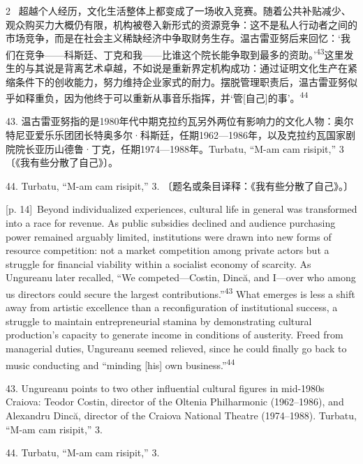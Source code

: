 \documentclass[10pt,a4paper]{article}
\begin{document}
\begin{paracol}{2}
\switchcolumn*
{\scriptsize\color{gray} [p. 14]}\ 超越个人经历，文化生活整体上都变成了一场收入竞赛。随着公共补贴减少、观众购买力大概仍有限，机构被卷入新形式的资源竞争：这不是私人行动者之间的市场竞争，而是在社会主义稀缺经济中争取财务生存。温古雷亚努后来回忆：‘我们在竞争——科斯廷、丁克和我——比谁这个院长能争取到最多的资助。’\nobreak\textsuperscript{43}这里发生的与其说是背离艺术卓越，不如说是重新界定机构成功：通过证明文化生产在紧缩条件下的创收能力，努力维持企业家式的耐力。摆脱管理职责后，温古雷亚努似乎如释重负，因为他终于可以重新从事音乐指挥，并‘管[自己]的事’。\nobreak\textsuperscript{44}\par{\small 43. 温古雷亚努指的是1980年代中期克拉约瓦另外两位有影响力的文化人物：奥尔特尼亚爱乐乐团团长特奥多尔·科斯廷，任期1962—1986年，以及克拉约瓦国家剧院院长亚历山德鲁·丁克，任期1974—1988年。Turbatu, “M-am cam risipit,” 3〔《我有些分散了自己》〕。\par}{\small 44. Turbatu, “M-am cam risipit,” 3. 〔题名或条目译释：《我有些分散了自己》。〕\par}
\switchcolumn
{\scriptsize\color{gray} [p. 14]}\ Beyond individualized experiences, cultural life in general was transformed into a race for revenue. As public subsidies declined and audience purchasing power remained arguably limited, institutions were drawn into new forms of resource competition: not a market competition among private actors but a struggle for financial viability within a socialist economy of scarcity. As Ungureanu later recalled, “We competed—Costin, Dincă, and I—over who among us directors could secure the largest contributions.”\nobreak\textsuperscript{43} What emerges is less a shift away from artistic excellence than a reconfiguration of institutional success, a struggle to maintain entrepreneurial stamina by demonstrating cultural production’s capacity to generate income in conditions of austerity. Freed from managerial duties, Ungureanu seemed relieved, since he could finally go back to music conducting and “minding [his] own business.”\nobreak\textsuperscript{44}\par{\small 43. Ungureanu points to two other influential cultural figures in mid-1980s Craiova: Teodor Costin, director of the Oltenia Philharmonic (1962–1986), and Alexandru Dincă, director of the Craiova National Theatre (1974–1988). Turbatu, “M-am cam risipit,” 3.\par}{\small 44. Turbatu, “M-am cam risipit,” 3.\par}
\switchcolumn*

\end{paracol}
\end{document}

